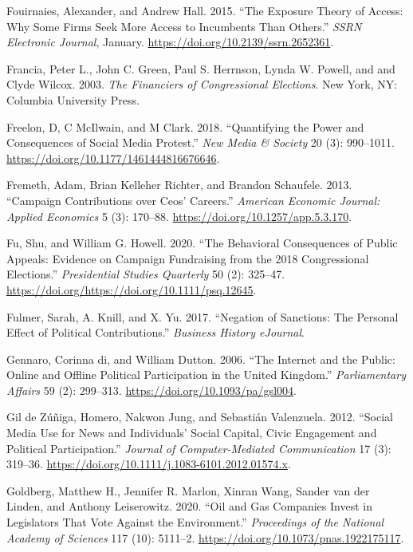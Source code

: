 \documentclass[12pt,]{article}
\begin{document}
\leavevmode\hypertarget{ref-fouirnaies2015}{}%
Fouirnaies, Alexander, and Andrew Hall. 2015. ``The Exposure Theory of
Access: Why Some Firms Seek More Access to Incumbents Than Others.''
\emph{SSRN Electronic Journal}, January.
\url{https://doi.org/10.2139/ssrn.2652361}.

\leavevmode\hypertarget{ref-francia2003}{}%
Francia, Peter L., John C. Green, Paul S. Herrnson, Lynda W. Powell, and
and Clyde Wilcox. 2003. \emph{The Financiers of Congressional
Elections}. New York, NY: Columbia University Press.

\leavevmode\hypertarget{ref-freelon2018}{}%
Freelon, D, C McIlwain, and M Clark. 2018. ``Quantifying the Power and
Consequences of Social Media Protest.'' \emph{New Media \& Society} 20
(3): 990--1011. \url{https://doi.org/10.1177/1461444816676646}.

\leavevmode\hypertarget{ref-fremeth2013}{}%
Fremeth, Adam, Brian Kelleher Richter, and Brandon Schaufele. 2013.
``Campaign Contributions over Ceos' Careers.'' \emph{American Economic
Journal: Applied Economics} 5 (3): 170--88.
\url{https://doi.org/10.1257/app.5.3.170}.

\leavevmode\hypertarget{ref-fu2020}{}%
Fu, Shu, and William G. Howell. 2020. ``The Behavioral Consequences of
Public Appeals: Evidence on Campaign Fundraising from the 2018
Congressional Elections.'' \emph{Presidential Studies Quarterly} 50 (2):
325--47. \url{https://doi.org/https://doi.org/10.1111/psq.12645}.

\leavevmode\hypertarget{ref-fulmer2017}{}%
Fulmer, Sarah, A. Knill, and X. Yu. 2017. ``Negation of Sanctions: The
Personal Effect of Political Contributions.'' \emph{Business History
eJournal}.

\leavevmode\hypertarget{ref-degennaro2006}{}%
Gennaro, Corinna di, and William Dutton. 2006. ``The Internet and the
Public: Online and Offline Political Participation in the United
Kingdom.'' \emph{Parliamentary Affairs} 59 (2): 299--313.
\url{https://doi.org/10.1093/pa/gsl004}.

\leavevmode\hypertarget{ref-zuniga2012}{}%
Gil de Zúñiga, Homero, Nakwon Jung, and Sebastián Valenzuela. 2012.
``Social Media Use for News and Individuals' Social Capital, Civic
Engagement and Political Participation.'' \emph{Journal of
Computer-Mediated Communication} 17 (3): 319--36.
\url{https://doi.org/10.1111/j.1083-6101.2012.01574.x}.

\leavevmode\hypertarget{ref-goldberg2020}{}%
Goldberg, Matthew H., Jennifer R. Marlon, Xinran Wang, Sander van der
Linden, and Anthony Leiserowitz. 2020. ``Oil and Gas Companies Invest in
Legislators That Vote Against the Environment.'' \emph{Proceedings of
the National Academy of Sciences} 117 (10): 5111--2.
\url{https://doi.org/10.1073/pnas.1922175117}.
\end{document}

